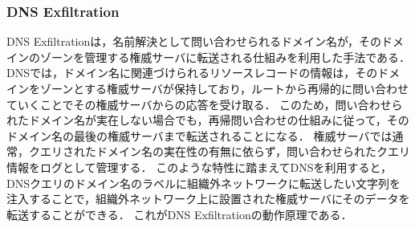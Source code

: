 \subsubsection{DNS Exfiltration}
\label{sec:dns-exfiltration}
DNS Exfiltrationは，名前解決として問い合わせられるドメイン名が，そのドメインのゾーンを管理する権威サーバに転送される仕組みを利用した手法である．
DNSでは，ドメイン名に関連づけられるリソースレコードの情報は，そのドメインをゾーンとする権威サーバが保持しており，ルートから再帰的に問い合わせていくことでその権威サーバからの応答を受け取る．
このため，問い合わせられたドメイン名が実在しない場合でも，再帰問い合わせの仕組みに従って，そのドメイン名の最後の権威サーバまで転送されることになる．
権威サーバでは通常，クエリされたドメイン名の実在性の有無に依らず，問い合わせられたクエリ情報をログとして管理する．
このような特性に踏まえてDNSを利用すると，DNSクエリのドメイン名のラベルに組織外ネットワークに転送したい文字列を注入することで，組織外ネットワーク上に設置された権威サーバにそのデータを転送することができる．
これがDNS Exfiltrationの動作原理である．

